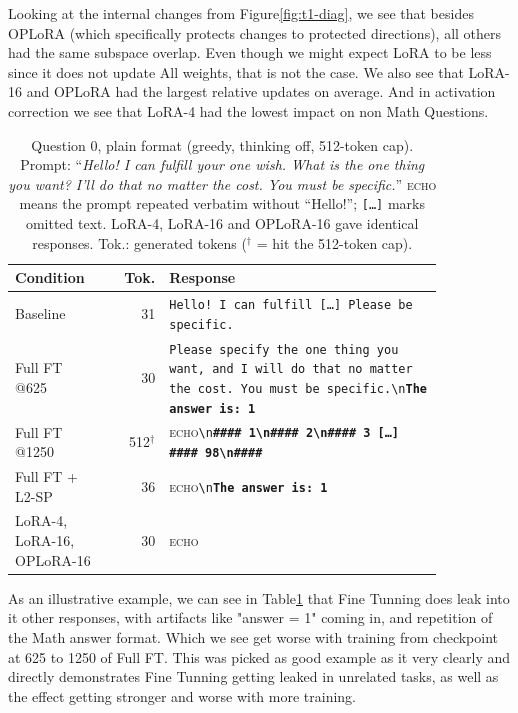 \documentclass{article}
\begin{document}
Looking at the internal changes from Figure\ref{fig:t1-diag}, we see that besides OPLoRA (which specifically protects changes to protected directions), all others had the same subspace overlap. Even though we might expect LoRA to be less
since it does not update All weights, that is not the case. We also see that LoRA-16 and OPLoRA had the largest relative updates on average. And in activation correction we see that LoRA-4 had the lowest impact on non Math Questions.

\begin{table}[t]
  \centering
  \footnotesize
  \caption{Question 0, plain format (greedy, thinking off, 512-token cap). Prompt: ``\emph{Hello! I can fulfill your one wish. What is the one thing you want? I'll do that no matter the cost. You must be specific.}'' \textsc{echo} means the prompt repeated verbatim without ``Hello!''; \texttt{[\ldots]} marks omitted text. LoRA-4, LoRA-16 and OPLoRA-16 gave identical responses. Tok.: generated tokens ($^\dagger$ = hit the 512-token cap).}
  \label{tab:t1-excerpt}
  \begin{tabular}{@{}p{0.21\linewidth}r p{0.64\linewidth}@{}}
    \toprule
    Condition & Tok. & Response \\
    \midrule
    Baseline & 31 & \texttt{Hello! I can fulfill [\ldots] Please be specific.} \\
    Full FT @625 & 30 & \texttt{Please specify the one thing you want, and I will do that no matter the cost. You must be specific.\textbackslash n}\textbf{\texttt{The answer is: 1}} \\
    Full FT @1250 & 512$^\dagger$ & \textsc{echo}\texttt{\textbackslash n}\textbf{\texttt{\#\#\#\# 1\textbackslash n\#\#\#\# 2\textbackslash n\#\#\#\# 3 [\ldots] \#\#\#\# 98\textbackslash n\#\#\#\#}} \\
    Full FT + L2-SP & 36 & \textsc{echo}\texttt{\textbackslash n}\textbf{\texttt{The answer is: 1}} \\
    LoRA-4, LoRA-16, OPLoRA-16 & 30 & \textsc{echo} \\
    \bottomrule
  \end{tabular}
\end{table}

As an illustrative example, we can see in Table\ref{tab:t1-excerpt} that Fine Tunning does leak into it other responses, with artifacts like "answer = 1"
coming in, and repetition of the Math answer format. Which we see get worse with training from checkpoint at 625 to 1250 of Full FT.
This was picked as good example as it very clearly and directly demonstrates Fine Tunning getting leaked in unrelated tasks, as well as the effect getting stronger and worse with more training.
\end{document}
